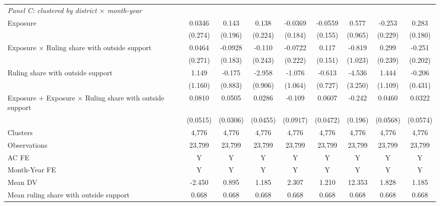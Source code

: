 {\begin{tabular}{l*{8}{c}}
\multicolumn{9}{l}{\textit{Panel C: clustered by district $\times$ month-year}} \\
Exposure    &      0.0346         &       0.143         &       0.138         &     -0.0369         &     -0.0559         &       0.577         &      -0.253         &       0.283         \\
            &     (0.274)         &     (0.196)         &     (0.224)         &     (0.184)         &     (0.155)         &     (0.965)         &     (0.229)         &     (0.180)         \\
Exposure $\times$ Ruling share with outside support&      0.0464         &     -0.0928         &      -0.110         &     -0.0722         &       0.117         &      -0.819         &       0.299         &      -0.251         \\
            &     (0.271)         &     (0.183)         &     (0.243)         &     (0.222)         &     (0.151)         &     (1.023)         &     (0.239)         &     (0.202)         \\
Ruling share with outside support&       1.149         &      -0.175         &      -2.958\sym{***}&      -1.076         &      -0.613         &      -4.536         &       1.444         &      -0.206         \\
            &     (1.160)         &     (0.883)         &     (0.906)         &     (1.064)         &     (0.727)         &     (3.250)         &     (1.109)         &     (0.431)         \\

Exposure + Exposure $\times$ Ruling share with outside support&      0.0810         &0.0505\sym{*}         &      0.0286         &      -0.109         &      0.0607         &      -0.242         &      0.0460         &      0.0322         \\
            &    (0.0515)         &    (0.0306)         &    (0.0455)         &    (0.0917)         &    (0.0472)         &     (0.196)         &    (0.0568)         &    (0.0574)         \\
Clusters    &       4,776         &       4,776         &       4,776         &       4,776         &       4,776         &       4,776         &       4,776         &       4,776         \\
\midrule



Observations&      23,799&      23,799&      23,799&      23,799&      23,799&      23,799&      23,799&      23,799\\
AC FE       &           Y&           Y&           Y&           Y&           Y&           Y&           Y&           Y\\
Month-Year FE&           Y&           Y&           Y&           Y&           Y&           Y&           Y&           Y\\
Mean DV     &      -2.450&       0.895&       1.185&       2.307&       1.210&      12.353&       1.828&       1.185\\
Mean ruling share with outside support&       0.668&       0.668&       0.668&       0.668&       0.668&       0.668&       0.668&       0.668\\
\bottomrule
\end{tabular}
}
